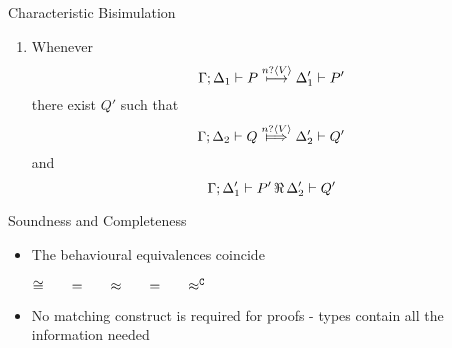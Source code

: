 \documentclass{beamer}
\begin{document}
	\begin{frame}{Characteristic Bisimulation}

		\begin{enumerate}[$(\bullet)$]
			\item	Whenever
				\[
					\Gamma; \Delta_1 \vdash P \stackrel{n ? \langle V \rangle}{\longmapsto} \Delta_1' \vdash P'
				\]
				there exist $Q'$ such that 
				\[
					\Gamma; \Delta_2 \proves Q \Hby{\bactinp{n}{V}} \Delta_2' \proves Q'
				\]
				and
				\[
					\Gamma; \Delta_1' \vdash P'\, \Re\, \Delta_2' \vdash Q'
				\]
		\end{enumerate}
	\end{frame}

	\begin{frame}{Soundness and Completeness}
		\begin{itemize}
			\item	The behavioural equivalences coincide

				\begin{theorem}
					\begin{center}
					$\cong \qquad =\qquad \approx \qquad =\qquad \approx^\mathtt{C}$
					\end{center}
				\end{theorem}

			\item	No matching construct is required for proofs - types contain all the information needed

		\end{itemize}
	\end{frame}
\end{document}
